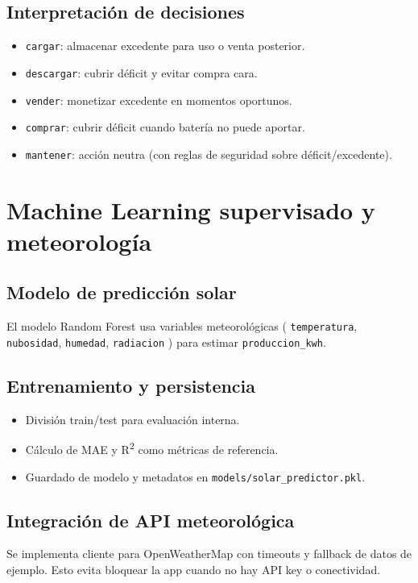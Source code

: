\documentclass[12pt,a4paper]{article}
\begin{document}
\subsection{Interpretaci\'on de decisiones}
\begin{itemize}
    \item \texttt{cargar}: almacenar excedente para uso o venta posterior.
    \item \texttt{descargar}: cubrir d\'eficit y evitar compra cara.
    \item \texttt{vender}: monetizar excedente en momentos oportunos.
    \item \texttt{comprar}: cubrir d\'eficit cuando bater\'ia no puede aportar.
    \item \texttt{mantener}: acci\'on neutra (con reglas de seguridad sobre d\'eficit/excedente).
\end{itemize}

\section{Machine Learning supervisado y meteorolog\'ia}
\subsection{Modelo de predicci\'on solar}
El modelo Random Forest usa variables meteorol\'ogicas (
\texttt{temperatura}, \texttt{nubosidad}, \texttt{humedad}, \texttt{radiacion}
) para estimar \texttt{produccion\_kwh}.

\subsection{Entrenamiento y persistencia}
\begin{itemize}
    \item Divisi\'on train/test para evaluaci\'on interna.
    \item C\'alculo de MAE y R\textsuperscript{2} como m\'etricas de referencia.
    \item Guardado de modelo y metadatos en \texttt{models/solar\_predictor.pkl}.
\end{itemize}

\subsection{Integraci\'on de API meteorol\'ogica}
Se implementa cliente para OpenWeatherMap con timeouts y fallback de datos de ejemplo. Esto evita bloquear la app cuando no hay API key o conectividad.
\end{document}
